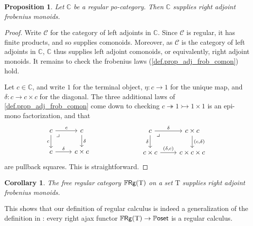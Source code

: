 \documentclass[11pt, oneside, article]{memoir}
\theoremstyle{plain}
\newtheorem{proposition}[theorem]{Proposition}
\newtheorem{corollary}[theorem]{Corollary}
\theoremstyle{definition}
\theoremstyle{remark}
\newcommand{\Set}[1]{\mathrm{#1}}%
\newcommand{\cat}[1]{\mathcal{#1}}%
\newcommand{\Cat}[1]{{\mathsf{#1}}}%
\newcommand{\CCat}[1]{\mathbb{\StrLeft{#1}{1}}\Cat{\StrGobbleLeft{#1}{1}}}%
\newcommand{\cc}{\mathbb{C}}
\newcommand{\surj}{\twoheadrightarrow}
\newcommand{\inj}{\rightarrowtail}
\newcommand{\types}{\Set{T}}
\newcommand{\pposet}{\CCat{Poset}}
\newcommand{\ffrg}[1][\types]{
  \ifthenelse{\equal{#1}{blank}}{\CCat{FRg}}{\CCat{FRg}(#1)}
}
\newcommand{\pb}[1][very near start]{\ar[dr, phantom, #1, "\lrcorner"]}
\begin{document}
\begin{proposition} \label{prop.regpocats_supply_rafms}
  Let $\cc$ be a regular po-category. Then $\cc$ supplies right adjoint frobenius monoids.
\end{proposition}
\begin{proof}
  Write $\cat{C}$ for the category of left adjoints in $\cc$. Since $\cat{C}$ is regular, it has finite products, and so supplies comonoids. Moreover, as $\cat{C}$ is the category of left adjoints in $\cc$, $\cc$ thus supplies left adjoint comonoids, or equivalently, right adjoint monoids. It remains to check the frobenius laws (\cref{def.prop_adj_frob_comon}) hold.

  Let $c \in \cc$, and write $1$ for the terminal object, $\eta\colon c \to 1$ for the unique map, and $\delta\colon c \to c\times c$ for the diagonal. The three additional laws of \cref{def.prop_adj_frob_comon} come down to checking $c \surj 1 \inj 1 \times 1$ is an epi-mono factorization, and that
  \[
    \begin{tikzcd}
      c \ar[r,"c"] \ar[d,"c"'] \pb & c \ar[d,"\delta"] \\
      c \ar[r,"\delta"] & c \times c
    \end{tikzcd}
    \hspace{2.5cm}
    \begin{tikzcd}
      c \ar[r,"\delta"] \ar[d,"\delta"'] \pb & c\times c \ar[d,"{(c,\delta)}"] \\
      c\times c \ar[r,"{(\delta,c)}"] & c \times c \times c
    \end{tikzcd}
  \]
  are pullback squares. This is straightforward.
\end{proof}

\begin{corollary}
  The free regular category $\ffrg$ on a set $\types$ supplies right adjoint frobenius monoids.
\end{corollary}

This shows that our definition of regular calculus is indeed a generalization of the definition in \cite{fong2018graphical}: every right ajax functor $\ffrg \to \pposet$ is a regular calculus. 
\end{document}
